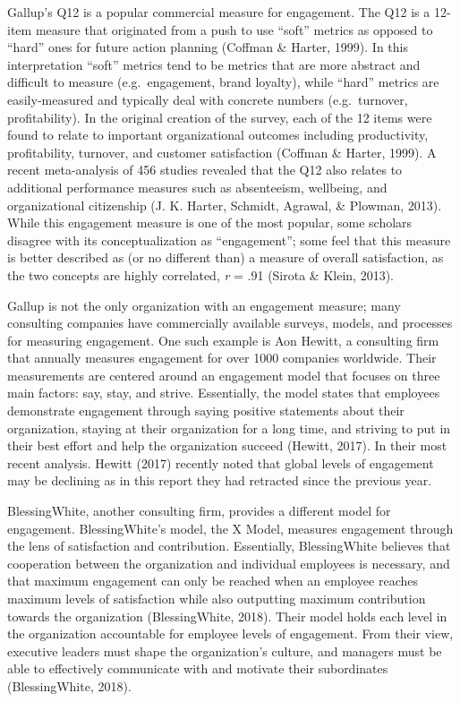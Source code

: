 \documentclass[
  man]{apa7}
\begin{document}
Gallup's Q12 is a popular commercial measure for engagement. The Q12 is a 12-item measure that originated from a push to use ``soft'' metrics as opposed to ``hard'' ones for future action planning (Coffman \& Harter, 1999). In this interpretation ``soft'' metrics tend to be metrics that are more abstract and difficult to measure (e.g.~engagement, brand loyalty), while ``hard'' metrics are easily-measured and typically deal with concrete numbers (e.g.~turnover, profitability). In the original creation of the survey, each of the 12 items were found to relate to important organizational outcomes including productivity, profitability, turnover, and customer satisfaction (Coffman \& Harter, 1999). A recent meta-analysis of 456 studies revealed that the Q12 also relates to additional performance measures such as absenteeism, wellbeing, and organizational citizenship (J. K. Harter, Schmidt, Agrawal, \& Plowman, 2013). While this engagement measure is one of the most popular, some scholars disagree with its conceptualization as ``engagement''; some feel that this measure is better described as (or no different than) a measure of overall satisfaction, as the two concepts are highly correlated, \emph{r} = .91 (Sirota \& Klein, 2013).

Gallup is not the only organization with an engagement measure; many consulting companies have commercially available surveys, models, and processes for measuring engagement. One such example is Aon Hewitt, a consulting firm that annually measures engagement for over 1000 companies worldwide. Their measurements are centered around an engagement model that focuses on three main factors: say, stay, and strive. Essentially, the model states that employees demonstrate engagement through saying positive statements about their organization, staying at their organization for a long time, and striving to put in their best effort and help the organization succeed (Hewitt, 2017). In their most recent analysis. Hewitt (2017) recently noted that global levels of engagement may be declining as in this report they had retracted since the previous year.

BlessingWhite, another consulting firm, provides a different model for engagement. BlessingWhite's model, the X Model, measures engagement through the lens of satisfaction and contribution. Essentially, BlessingWhite believes that cooperation between the organization and individual employees is necessary, and that maximum engagement can only be reached when an employee reaches maximum levels of satisfaction while also outputting maximum contribution towards the organization (BlessingWhite, 2018). Their model holds each level in the organization accountable for employee levels of engagement. From their view, executive leaders must shape the organization's culture, and managers must be able to effectively communicate with and motivate their subordinates (BlessingWhite, 2018).
\end{document}
